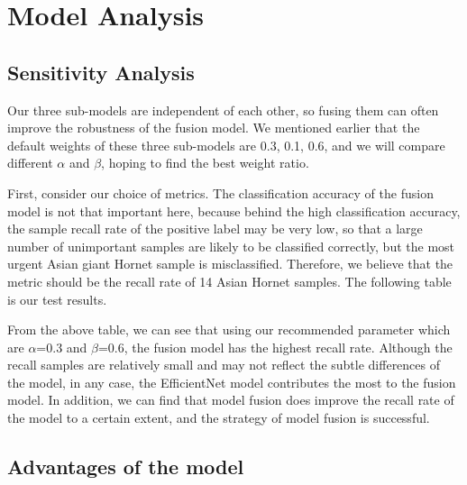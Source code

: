 \documentclass{mcmthesis}
\numberwithin{figure}{section}
\numberwithin{table}{section}
\begin{document}
\section{Model Analysis}
\subsection{Sensitivity Analysis}
Our three sub-models are independent of each other, so fusing them can often improve the robustness of the fusion model. We mentioned earlier that the default weights of these three sub-models are 0.3, 0.1, 0.6, and we will compare different $\alpha$ and $\beta$, hoping to find the best weight ratio.

First, consider our choice of metrics. The classification accuracy of the fusion model is not that important here, because behind the high classification accuracy, the sample recall rate of the positive label may be very low, so that a large number of unimportant samples are likely to be classified correctly, but the most urgent Asian giant Hornet sample is misclassified. Therefore, we believe that the metric should be the recall rate of 14 Asian Hornet samples. The following table is our test results.


From the above table, we can see that using our recommended parameter which are $\alpha$=0.3 and $\beta$=0.6, the fusion model has the highest recall rate. Although the recall samples are relatively small and may not reflect the subtle differences of the model, in any case, the EfficientNet model contributes the most to the fusion model. In addition, we can find that model fusion does improve the recall rate of the model to a certain extent, and the strategy of model fusion is successful.

\subsection{Advantages of the model}
\end{document}
